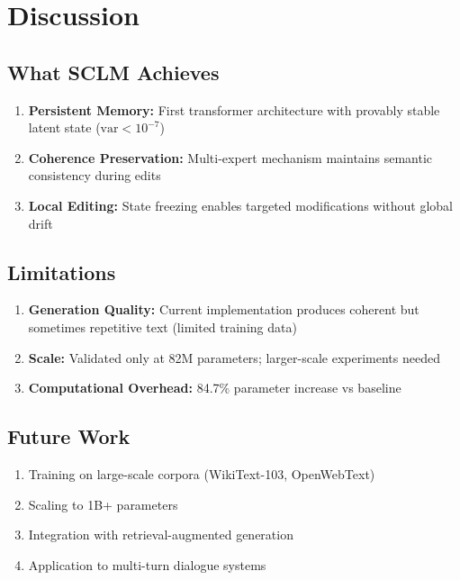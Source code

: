 \documentclass[11pt,a4paper]{article}
\begin{document}
\section{Discussion}

\subsection{What SCLM Achieves}

\begin{enumerate}
    \item \textbf{Persistent Memory:} First transformer architecture with provably stable latent state ($\text{var} < 10^{-7}$)
    \item \textbf{Coherence Preservation:} Multi-expert mechanism maintains semantic consistency during edits
    \item \textbf{Local Editing:} State freezing enables targeted modifications without global drift
\end{enumerate}

\subsection{Limitations}

\begin{enumerate}
    \item \textbf{Generation Quality:} Current implementation produces coherent but sometimes repetitive text (limited training data)
    \item \textbf{Scale:} Validated only at 82M parameters; larger-scale experiments needed
    \item \textbf{Computational Overhead:} 84.7\% parameter increase vs baseline
\end{enumerate}

\subsection{Future Work}

\begin{enumerate}
    \item Training on large-scale corpora (WikiText-103, OpenWebText)
    \item Scaling to 1B+ parameters
    \item Integration with retrieval-augmented generation
    \item Application to multi-turn dialogue systems
\end{enumerate}
\end{document}
